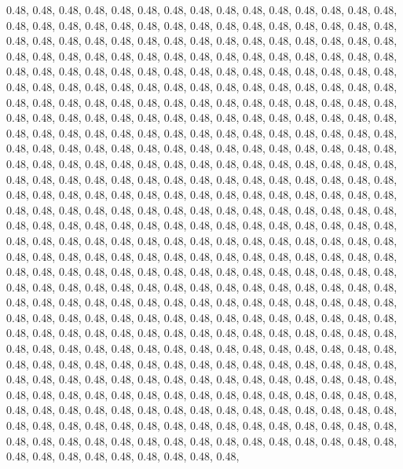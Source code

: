 \documentclass[11pt,]{article}
\begin{document}
0.48, 0.48, 0.48, 0.48, 0.48, 0.48, 0.48, 0.48, 0.48, 0.48, 0.48, 0.48,
0.48, 0.48, 0.48, 0.48, 0.48, 0.48, 0.48, 0.48, 0.48, 0.48, 0.48, 0.48,
0.48, 0.48, 0.48, 0.48, 0.48, 0.48, 0.48, 0.48, 0.48, 0.48, 0.48, 0.48,
0.48, 0.48, 0.48, 0.48, 0.48, 0.48, 0.48, 0.48, 0.48, 0.48, 0.48, 0.48,
0.48, 0.48, 0.48, 0.48, 0.48, 0.48, 0.48, 0.48, 0.48, 0.48, 0.48, 0.48,
0.48, 0.48, 0.48, 0.48, 0.48, 0.48, 0.48, 0.48, 0.48, 0.48, 0.48, 0.48,
0.48, 0.48, 0.48, 0.48, 0.48, 0.48, 0.48, 0.48, 0.48, 0.48, 0.48, 0.48,
0.48, 0.48, 0.48, 0.48, 0.48, 0.48, 0.48, 0.48, 0.48, 0.48, 0.48, 0.48,
0.48, 0.48, 0.48, 0.48, 0.48, 0.48, 0.48, 0.48, 0.48, 0.48, 0.48, 0.48,
0.48, 0.48, 0.48, 0.48, 0.48, 0.48, 0.48, 0.48, 0.48, 0.48, 0.48, 0.48,
0.48, 0.48, 0.48, 0.48, 0.48, 0.48, 0.48, 0.48, 0.48, 0.48, 0.48, 0.48,
0.48, 0.48, 0.48, 0.48, 0.48, 0.48, 0.48, 0.48, 0.48, 0.48, 0.48, 0.48,
0.48, 0.48, 0.48, 0.48, 0.48, 0.48, 0.48, 0.48, 0.48, 0.48, 0.48, 0.48,
0.48, 0.48, 0.48, 0.48, 0.48, 0.48, 0.48, 0.48, 0.48, 0.48, 0.48, 0.48,
0.48, 0.48, 0.48, 0.48, 0.48, 0.48, 0.48, 0.48, 0.48, 0.48, 0.48, 0.48,
0.48, 0.48, 0.48, 0.48, 0.48, 0.48, 0.48, 0.48, 0.48, 0.48, 0.48, 0.48,
0.48, 0.48, 0.48, 0.48, 0.48, 0.48, 0.48, 0.48, 0.48, 0.48, 0.48, 0.48,
0.48, 0.48, 0.48, 0.48, 0.48, 0.48, 0.48, 0.48, 0.48, 0.48, 0.48, 0.48,
0.48, 0.48, 0.48, 0.48, 0.48, 0.48, 0.48, 0.48, 0.48, 0.48, 0.48, 0.48,
0.48, 0.48, 0.48, 0.48, 0.48, 0.48, 0.48, 0.48, 0.48, 0.48, 0.48, 0.48,
0.48, 0.48, 0.48, 0.48, 0.48, 0.48, 0.48, 0.48, 0.48, 0.48, 0.48, 0.48,
0.48, 0.48, 0.48, 0.48, 0.48, 0.48, 0.48, 0.48, 0.48, 0.48, 0.48, 0.48,
0.48, 0.48, 0.48, 0.48, 0.48, 0.48, 0.48, 0.48, 0.48, 0.48, 0.48, 0.48,
0.48, 0.48, 0.48, 0.48, 0.48, 0.48, 0.48, 0.48, 0.48, 0.48, 0.48, 0.48,
0.48, 0.48, 0.48, 0.48, 0.48, 0.48, 0.48, 0.48, 0.48, 0.48, 0.48, 0.48,
0.48, 0.48, 0.48, 0.48, 0.48, 0.48, 0.48, 0.48, 0.48, 0.48, 0.48, 0.48,
0.48, 0.48, 0.48, 0.48, 0.48, 0.48, 0.48, 0.48, 0.48, 0.48, 0.48, 0.48,
0.48, 0.48, 0.48, 0.48, 0.48, 0.48, 0.48, 0.48, 0.48, 0.48, 0.48, 0.48,
0.48, 0.48, 0.48, 0.48, 0.48, 0.48, 0.48, 0.48, 0.48, 0.48, 0.48, 0.48,
0.48, 0.48, 0.48, 0.48, 0.48, 0.48, 0.48, 0.48, 0.48, 0.48, 0.48, 0.48,
0.48, 0.48, 0.48, 0.48, 0.48, 0.48, 0.48, 0.48, 0.48, 0.48, 0.48, 0.48,
0.48, 0.48, 0.48, 0.48, 0.48, 0.48, 0.48, 0.48, 0.48, 0.48, 0.48, 0.48,
0.48, 0.48, 0.48, 0.48, 0.48, 0.48, 0.48, 0.48, 0.48, 0.48, 0.48, 0.48,
0.48, 0.48, 0.48, 0.48, 0.48, 0.48, 0.48, 0.48, 0.48, 0.48, 0.48, 0.48,
0.48, 0.48, 0.48, 0.48, 0.48, 0.48, 0.48, 0.48, 0.48, 0.48, 0.48, 0.48,
0.48, 0.48, 0.48, 0.48, 0.48, 0.48, 0.48, 0.48, 0.48, 0.48, 0.48, 0.48,
0.48, 0.48, 0.48, 0.48, 0.48, 0.48, 0.48, 0.48, 0.48, 0.48, 0.48, 0.48,
\end{document}
